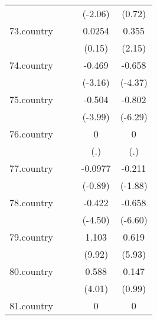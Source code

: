 {\begin{tabular}{l*{4}{c}}
            &                     &                     &     (-2.06)         &      (0.72)         \\
[1em]
73.country  &                     &                     &      0.0254         &       0.355\sym{*}  \\
            &                     &                     &      (0.15)         &      (2.15)         \\
[1em]
74.country  &                     &                     &      -0.469\sym{**} &      -0.658\sym{***}\\
            &                     &                     &     (-3.16)         &     (-4.37)         \\
[1em]
75.country  &                     &                     &      -0.504\sym{***}&      -0.802\sym{***}\\
            &                     &                     &     (-3.99)         &     (-6.29)         \\
[1em]
76.country  &                     &                     &           0         &           0         \\
            &                     &                     &         (.)         &         (.)         \\
[1em]
77.country  &                     &                     &     -0.0977         &      -0.211         \\
            &                     &                     &     (-0.89)         &     (-1.88)         \\
[1em]
78.country  &                     &                     &      -0.422\sym{***}&      -0.658\sym{***}\\
            &                     &                     &     (-4.50)         &     (-6.60)         \\
[1em]
79.country  &                     &                     &       1.103\sym{***}&       0.619\sym{***}\\
            &                     &                     &      (9.92)         &      (5.93)         \\
[1em]
80.country  &                     &                     &       0.588\sym{***}&       0.147         \\
            &                     &                     &      (4.01)         &      (0.99)         \\
[1em]
81.country  &                     &                     &           0         &           0         \\

\end{tabular}}
